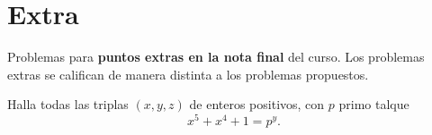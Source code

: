 \section{Extra}

Problemas para \textbf{puntos extras en la nota final} del curso.
Los problemas extras se califican de manera distinta a los problemas propuestos.

\begin{problem}
    Halla todas las triplas $(x, y, z)$ de enteros positivos, con $p$ primo talque
    \[
        x^5 + x^4 +1= p^y.
    \]
\end{problem}